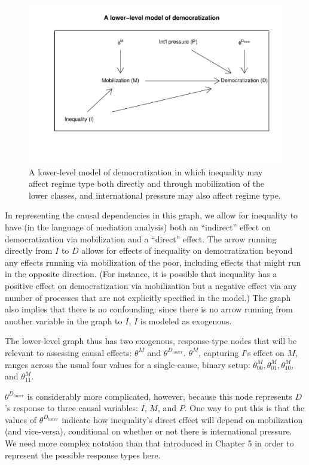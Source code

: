 \documentclass[
  12pt,
]{book}
\begin{document}
\begin{figure}

{\centering \includegraphics[width=.7\textwidth]{ii_files/figure-latex/lowdem-1} 

}

\caption{\label{fig:lowdem} A lower-level model of democratization in which inequality may affect regime type both directly and through mobilization of the lower classes, and international pressure may also affect regime type.}\label{fig:lowdem}
\end{figure}

In representing the causal dependencies in this graph, we allow for inequality to have (in the language of mediation analysis) both an ``indirect'' effect on democratization via mobilization and a ``direct'' effect. The arrow running directly from \(I\) to \(D\) allows for effects of inequality on democratization beyond any effects running via mobilization of the poor, including effects that might run in the opposite direction. (For instance, it is possible that inequality has a positive effect on democratization via mobilization but a negative effect via any number of processes that are not explicitly specified in the model.) The graph also implies that there is no confounding: since there is no arrow running from another variable in the graph to \(I\), \(I\) is modeled as exogenous.

The lower-level graph thus has two exogenous, response-type nodes that will be relevant to assessing causal effects: \(\theta^M\) and \(\theta^{D_{lower}}\). \(\theta^M\), capturing \(I\)'s effect on \(M\), ranges across the usual four values for a single-cause, binary setup: \(\theta_{00}^M, \theta_{01}^M, \theta_{10}^M\), and \(\theta_{11}^M\).

\(\theta^{D_{lower}}\) is considerably more complicated, however, because this node represents \(D\)'s response to three causal variables: \(I\), \(M\), and \(P\). One way to put this is that the values of \(\theta^{D_{lower}}\) indicate how inequality's direct effect will depend on mobilization (and vice-versa), conditional on whether or not there is international pressure. We need more complex notation than that introduced in Chapter 5 in order to represent the possible response types here.
\end{document}
